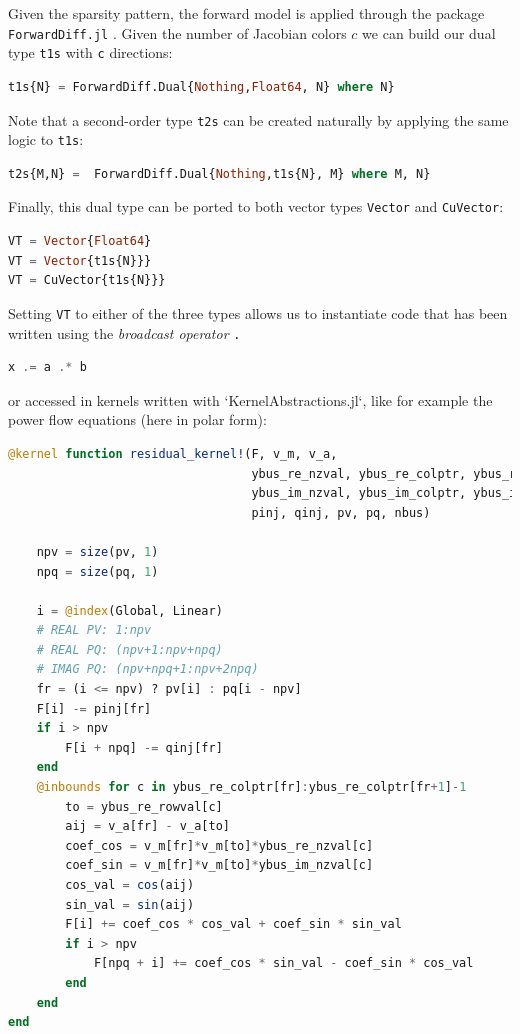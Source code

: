 \documentclass{juliacon}
\begin{document}
Given the sparsity pattern, the forward model is applied through the package
\lstinline{ForwardDiff.jl} \cite{RevelsLubinPapamarkou2016}. Given the number of Jacobian
colors $c$ we can build our dual type \lstinline{t1s} with \lstinline{c} directions:

\begin{lstlisting}[language = Julia]
t1s{N} = ForwardDiff.Dual{Nothing,Float64, N} where N}
\end{lstlisting}

Note that a second-order type \lstinline{t2s} can be created naturally by applying the same logic to \lstinline{t1s}:

\begin{lstlisting}[language = Julia]
t2s{M,N} =  ForwardDiff.Dual{Nothing,t1s{N}, M} where M, N}
\end{lstlisting}

Finally, this dual type can be ported to both vector types \lstinline{Vector} and \lstinline{CuVector}:

\begin{lstlisting}[language = Julia]
VT = Vector{Float64}
VT = Vector{t1s{N}}}
VT = CuVector{t1s{N}}}
\end{lstlisting}

Setting \lstinline{VT} to either of the three types allows us to instantiate code that has been written using the {\it broadcast operator} \lstinline{.}

\begin{lstlisting}[language = Julia]
x .= a .* b
\end{lstlisting}

or accessed in kernels written with `KernelAbstractions.jl`, like for example the power flow equations (here in polar form):

\begin{lstlisting}[language = Julia]
@kernel function residual_kernel!(F, v_m, v_a,
                                  ybus_re_nzval, ybus_re_colptr, ybus_re_rowval,
                                  ybus_im_nzval, ybus_im_colptr, ybus_im_rowval,
                                  pinj, qinj, pv, pq, nbus)

    npv = size(pv, 1)
    npq = size(pq, 1)

    i = @index(Global, Linear)
    # REAL PV: 1:npv
    # REAL PQ: (npv+1:npv+npq)
    # IMAG PQ: (npv+npq+1:npv+2npq)
    fr = (i <= npv) ? pv[i] : pq[i - npv]
    F[i] -= pinj[fr]
    if i > npv
        F[i + npq] -= qinj[fr]
    end
    @inbounds for c in ybus_re_colptr[fr]:ybus_re_colptr[fr+1]-1
        to = ybus_re_rowval[c]
        aij = v_a[fr] - v_a[to]
        coef_cos = v_m[fr]*v_m[to]*ybus_re_nzval[c]
        coef_sin = v_m[fr]*v_m[to]*ybus_im_nzval[c]
        cos_val = cos(aij)
        sin_val = sin(aij)
        F[i] += coef_cos * cos_val + coef_sin * sin_val
        if i > npv
            F[npq + i] += coef_cos * sin_val - coef_sin * cos_val
        end
    end
end
\end{lstlisting}
\end{document}
